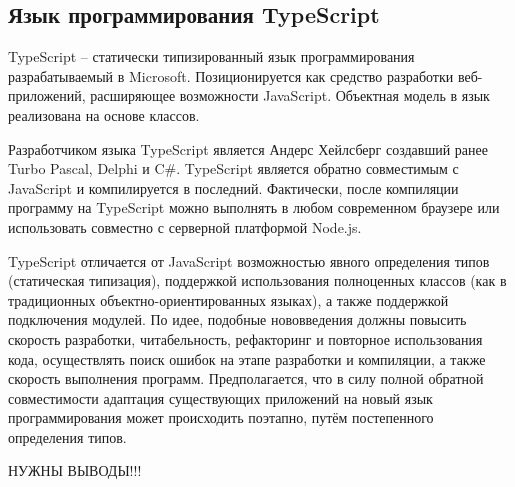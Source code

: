 \subsection{Язык программирования TypeScript}

TypeScript -- статически типизированный язык программирования разрабатываемый в Microsoft. Позиционируется как средство разработки веб-приложений, расширяющее возможности JavaScript. Объектная модель в язык реализована на основе классов.

Разработчиком языка TypeScript является Андерс Хейлсберг создавший ранее Turbo Pascal, Delphi и C\#.
TypeScript является обратно совместимым с JavaScript и компилируется в последний. Фактически, после компиляции программу на TypeScript можно выполнять в любом современном браузере или использовать совместно с серверной платформой Node.js.

TypeScript отличается от JavaScript возможностью явного определения типов (статическая типизация), поддержкой использования полноценных классов (как в традиционных объектно-ориентированных языках), а также поддержкой подключения модулей. По идее, подобные нововведения должны повысить скорость разработки, читабельность, рефакторинг и повторное использования кода, осуществлять поиск ошибок на этапе разработки и компиляции, а также скорость выполнения программ.
Предполагается, что в силу полной обратной совместимости адаптация существующих приложений на новый язык программирования может происходить поэтапно, путём постепенного определения типов. \cite{wiki:TypeScript, TypeScript}

НУЖНЫ ВЫВОДЫ!!!